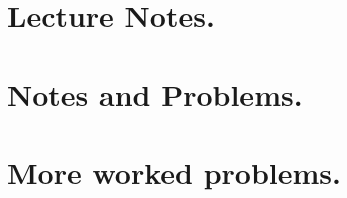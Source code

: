 \part{Lecture Notes.}


\part{Notes and Problems.}














%

\part{More worked problems.}










